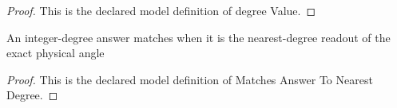 \begin{proof}
  This is the declared model definition of degree Value.
\end{proof}
\begin{definition}
  \label{def:physics:phyx-mini-0063:phyxminiproblems-problemphyxmini0063-matchesanswertonearestdegree}
  An integer-degree answer matches when it is the nearest-degree readout of the exact physical angle
\end{definition}
\begin{proof}
  This is the declared model definition of Matches Answer To Nearest Degree.
\end{proof}
